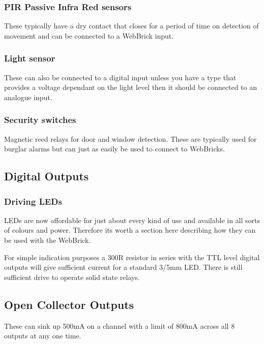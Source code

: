 	\subsubsection{PIR Passive Infra Red sensors}
	These typically have a dry contact that closes for a period of time on detection of movement and can be
	connected to a WebBrick input.

	\subsubsection{Light sensor}
	These can also be connected to a digital input unless you have a type that provides a voltage dependant on
	the light level then it should be connected to an analogue input.

	\subsubsection{Security switches}
	Magnetic reed relays for door and window detection. These are typically used for burglar alarms but can just as easily be
	used to connect to WebBricks.

	\subsection{Digital Outputs}

	\subsubsection{Driving LEDs}

	LEDs are now affordable for just about every kind of use and available in all sorts of colours and power.  
	Therefore its worth a section here describing how they can be used with the WebBrick.

	For simple indication purposes a 300R resistor in series with the TTL level digital outputs will give 
	sufficient current for a standard 3/5mm LED.  There is still sufficient drive to operate solid state 
	relays. 

	\subsection{Open Collector Outputs}
	
		These can sink up 500mA on a channel with a limit of 800mA across all 8 outputs at any one time.


